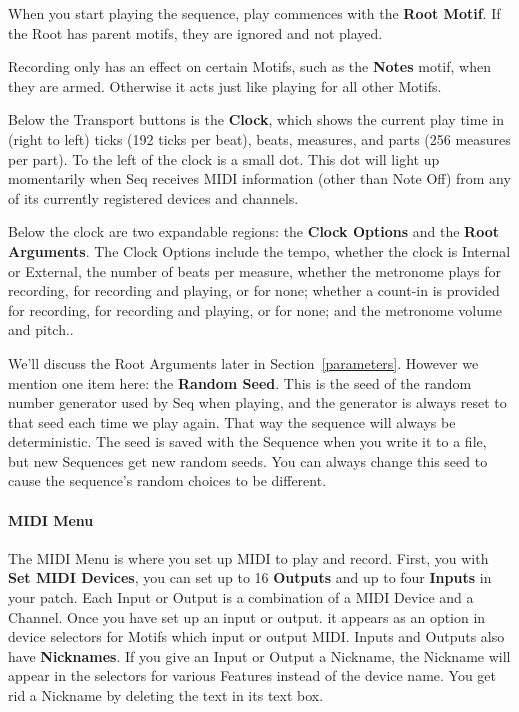 \documentclass[twoside,10pt]{article}
\begin{document}
When you start playing the sequence, play commences with the {\bf Root Motif}.  If the Root has parent motifs, they are ignored and not played.  

Recording only has an effect on certain Motifs, such as the {\bf Notes} motif, when they are armed.  Otherwise it acts just like playing for all other Motifs.

Below the Transport buttons is the {\bf Clock}, which shows the current play time in (right to left) ticks (192 ticks per beat), beats, measures, and parts (256 measures per part).  To the left of the clock is a small dot.  This dot will light up momentarily when Seq receives MIDI information (other than Note Off) from any of its currently registered devices and channels.

Below the clock are two expandable regions: the {\bf Clock Options} and the {\bf Root Arguments}.  The Clock Options include the tempo, whether the clock is Internal or External, the number of beats per measure, whether the metronome plays for recording,  for recording and playing, or for none; whether a count-in is provided for recording, for recording and playing, or for none; and the metronome volume and pitch..

We'll discuss the Root Arguments later in Section~\ref{parameters}.  However we mention one item here: the {\bf Random Seed}.  This is the seed of the random number generator used by Seq when playing, and the generator is always reset to that seed each time we play again.  That way the sequence will always be deterministic.  The seed is saved with the Sequence when you write it to a file, but new Sequences get new random seeds. You can always change this seed to cause the sequence's random choices to be different.

\paragraph{MIDI Menu}

The MIDI Menu is where you set up MIDI to play and record.  First, you with {\bf Set MIDI Devices}, you can set up to 16 {\bf Outputs} and up to four {\bf Inputs} in your patch.  Each Input or Output is a combination of a MIDI Device and a Channel.  Once you have set up an input or output. it appears as an option in device selectors for Motifs which input or output MIDI.  
Inputs and Outputs also have {\bf Nicknames}.  If you give an Input or Output a Nickname, the Nickname will appear in the selectors for various Features instead of the device name.  You get rid a Nickname by deleting the text in its text box.
\end{document}
